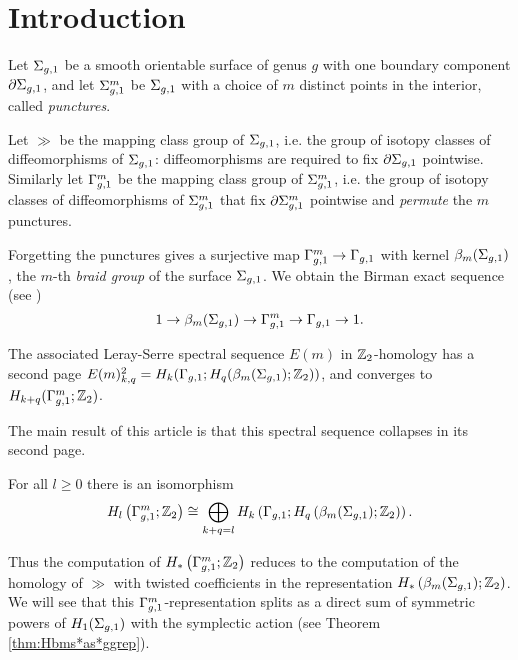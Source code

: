 \section{Introduction}
Let $\Sigma_{g,1}$ be a smooth orientable surface of genus $g$ with one boundary component $\partial\Sigma_{g,1}$, and let $\Sigma_{g,1}^m$ be $\Sigma_{g,1}$ with
a choice of $m$ distinct points in the interior, called \emph{punctures}.

Let $\gg$ be the mapping class group of $\Sigma_{g,1}$, i.e. the group of isotopy classes of diffeomorphisms of $\Sigma_{g,1}$:
diffeomorphisms are required to fix $\partial\Sigma_{g,1}$ pointwise. Similarly let $\Gamma_{g,1}^m$ be the mapping class group of $\Sigma_{g,1}^m$, i.e.
the group of isotopy classes of diffeomorphisms of $\Sigma_{g,1}^m$ that fix $\partial\Sigma_{g,1}^m$ pointwise and \emph{permute} the $m$ punctures.

Forgetting the punctures gives a surjective map $\Gamma_{g,1}^m\to\Gamma_{g,1}$ with kernel $\beta_{m}(\Sigma_{g,1})$,
the $m$-th \emph{braid group} of the surface $\Sigma_{g,1}$. We obtain the Birman exact sequence (see \cite{Birman:mcgbr})
\begin{equation}
\label{eq:Birman}
1\to\beta_{m}(\Sigma_{g,1})\to\Gamma_{g,1}^m\to\Gamma_{g,1}\to 1.
\end{equation}

The associated Leray-Serre spectral sequence $E(m)$ in $\mathbb{Z}_2$-homology has a second page $E(m)^2_{k,q}=H_k(\Gamma_{g,1};H_q(\beta_{m}(\Sigma_{g,1});\mathbb{Z}_2))$,
and converges to $H_{k+q}(\Gamma_{g,1}^m;\mathbb{Z}_2)$.

The main result of this article is that this spectral sequence collapses in its second page.
\begin{thm}
\label{thm:main}
For all $l\geq 0$ there is an isomorphism
\begin{equation}
\label{eq:main}
H_l\left(\Gamma_{g,1}^m;\mathbb{Z}_2\right)\cong \bigoplus_{k+q=l} H_k\left(\Gamma_{g,1};H_q\left(\beta_{m}(\Sigma_{g,1});\mathbb{Z}_2\right)\right).
\end{equation}
\end{thm}
Thus the computation of $H_*\left(\Gamma_{g,1}^m;\mathbb{Z}_2\right)$ reduces to the computation of the homology of $\gg$ with
twisted coefficients in the representation $H_*\left(\beta_{m}(\Sigma_{g,1});\mathbb{Z}_2\right)$. We will see that this $\Gamma_{g,1}^m$-representation
splits as a direct sum of symmetric powers of $H_1(\Sigma_{g,1})$ with the symplectic action
(see Theorem \ref{thm:Hbms*as*ggrep}).

